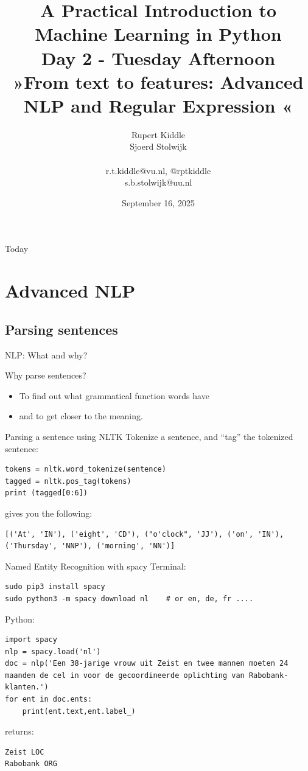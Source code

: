 \documentclass[compress]{beamer}
\title[Big Data and Automated Content Analysis]{\textbf{A Practical Introduction to Machine Learning in Python} \\Day 2 - Tuesday Afternoon \\ »From text to features: Advanced NLP and Regular Expression «}
\author[Rupert Kiddle, Sjoerd Stolwijk]{Rupert Kiddle \\ Sjoerd Stolwijk \\ ~ \\ \footnotesize{r.t.kiddle@vu.nl, @rptkiddle \\ s.b.stolwijk@uu.nl} \\}
\date{September 16, 2025}
\institute[Gesis]{Gesis}
\begin{document}
	
	\begin{frame}{}
		\titlepage
	\end{frame}
	
	\begin{frame}{Today}
		\tableofcontents
	\end{frame}


\section{Advanced NLP}

\subsection{Parsing sentences}
\begin{frame}{NLP: What and why?}
\begin{block}{Why parse sentences?}
\begin{itemize}
	\item To find out what grammatical function words have
	\item and to get closer to the meaning.
\end{itemize}
\end{block}
\end{frame}



\begin{frame}[fragile]{Parsing a sentence using NLTK}
Tokenize a sentence, and ``tag'' the tokenized sentence:
\begin{lstlisting}
tokens = nltk.word_tokenize(sentence)
tagged = nltk.pos_tag(tokens)
print (tagged[0:6])
\end{lstlisting}
gives you the following:
\begin{lstlisting}
[('At', 'IN'), ('eight', 'CD'), ("o'clock", 'JJ'), ('on', 'IN'),
('Thursday', 'NNP'), ('morning', 'NN')]
\end{lstlisting}


\end{frame}


\begin{frame}[fragile]{Named Entity Recognition with spacy}
Terminal:

\begin{lstlisting}
sudo pip3 install spacy
sudo python3 -m spacy download nl    # or en, de, fr ....
\end{lstlisting}

Python:

\begin{lstlisting}
import spacy
nlp = spacy.load('nl')
doc = nlp('Een 38-jarige vrouw uit Zeist en twee mannen moeten 24 maanden de cel in voor de gecoordineerde oplichting van Rabobank-klanten.')
for ent in doc.ents:
    print(ent.text,ent.label_)
\end{lstlisting}

returns:

\begin{lstlisting}
Zeist LOC
Rabobank ORG
\end{lstlisting}  

\end{frame}
\end{document}
